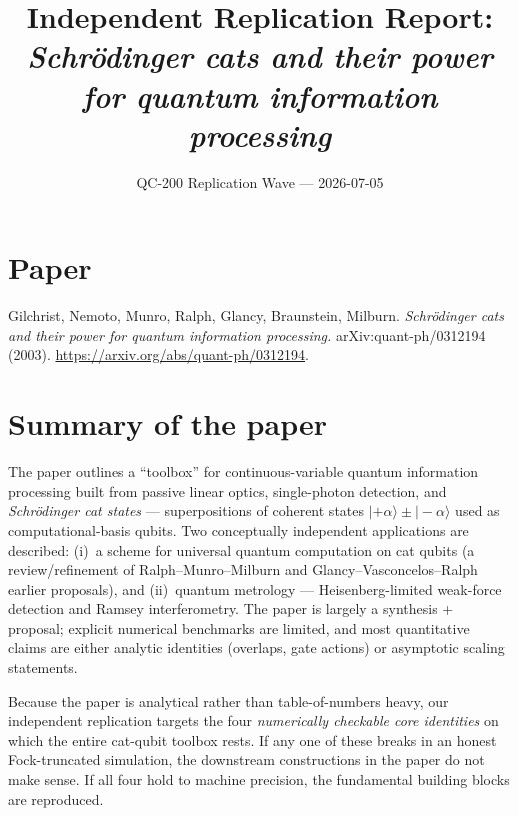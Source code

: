 \documentclass[11pt,letterpaper]{article}
\title{Independent Replication Report:\\
       \emph{Schr\"odinger cats and their power for quantum information processing}}
\author{QC-200 Replication Wave --- 2026-07-05}
\date{}
\begin{document}
\maketitle

\section*{Paper}
Gilchrist, Nemoto, Munro, Ralph, Glancy, Braunstein, Milburn.
\emph{Schr\"odinger cats and their power for quantum information processing.}
arXiv:quant-ph/0312194 (2003).
\href{https://arxiv.org/abs/quant-ph/0312194}{https://arxiv.org/abs/quant-ph/0312194}.

\section{Summary of the paper}
The paper outlines a ``toolbox'' for continuous-variable quantum
information processing built from passive linear optics, single-photon
detection, and \emph{Schr\"odinger cat states} --- superpositions of
coherent states $|{+}\alpha\rangle \pm |{-}\alpha\rangle$ used as
computational-basis qubits. Two conceptually independent applications
are described: (i)~a scheme for universal quantum computation on cat
qubits (a review/refinement of Ralph--Munro--Milburn and
Glancy--Vasconcelos--Ralph earlier proposals), and (ii)~quantum
metrology --- Heisenberg-limited weak-force detection and Ramsey
interferometry. The paper is largely a synthesis + proposal; explicit
numerical benchmarks are limited, and most quantitative claims are
either analytic identities (overlaps, gate actions) or asymptotic
scaling statements.

Because the paper is analytical rather than table-of-numbers heavy, our
independent replication targets the four \emph{numerically checkable
core identities} on which the entire cat-qubit toolbox rests. If any
one of these breaks in an honest Fock-truncated simulation, the
downstream constructions in the paper do not make sense. If all four
hold to machine precision, the fundamental building blocks are
reproduced.
\end{document}
